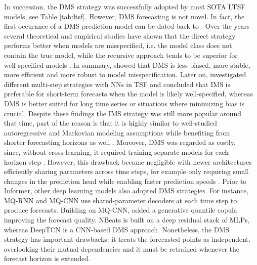 \documentclass[a4paper,oneside,bibliography=totoc]{scrbook}
\begin{document}
\noindent
In succession, the DMS strategy was successfully adopted by most SOTA LTSF models, see Table \ref{tab:ltsf}. However, DMS forecasting is not novel. 
In fact, the first occurance of a DMS prediction model can be dated back to \citet{cox_prediction_1961}.
Over the years several theoretical and empirical studies have shown that the direct strategy performs better when models are misspecified, i.e. the model class does not contain the true model, while the recursive approach tends to be superior for well-specified models \cite{weiss_multi-step_1991, tiao_advances_1994, ing_accumulated_2007, chevillon_non-parametric_2005}.
In summary, \citet{chevillon_direct_2007} showed that DMS is less biased, more stable, more efficient and more robust to model misspecification.
Later on, \citet{taieb_bias_2016} investigated different multi-step strategies with NNs in TSF and concluded that IMS is preferable for short-term forecasts when the model is likely well-specified, whereas DMS is better suited for long time series or situations where minimizing bias is crucial.
Despite these findings the IMS strategy was still more popular around that time, part of the reason is that it is highly similar to well-studied autoregressive and Markovian modeling assumptions while benefiting from shorter forecasting horizons as well \cite{wen_multi-horizon_2018}.
Moreover, DMS was regarded as costly, since, without cross-learning, it required training separate models for each horizon step \cite{bontempi_machine_2013}. However, this drawback became negligible with newer architectures efficiently sharing parameters across time steps, for example only requiring small changes in the prediction head while enabling faster prediction speeds \cite{zhou_informer_2021}.
Prior to Informer, other deep learning models also adopted DMS strategies.
For instance, MQ-RNN and MQ-CNN \cite{wen_multi-horizon_2018} use shared-parameter decoders at each time step to produce forecasts. 
Building on MQ-CNN, \citet{wen_deep_2019} added a generative quantile copula improving the forecast quality.
NBeats \cite{oreshkin_n-beats_2019} is built on a deep residual stack of MLPs, whereas DeepTCN \cite{chen_probabilistic_2019} is a CNN-based DMS approach.
Nonetheless, the DMS strategy has important drawbacks: it treats the forecasted points as independent, overlooking their mutual dependencies \cite{kline_methods_2004, bontempi_machine_2013} and it must be retrained whenever the forecast horizon is extended.
\end{document}
